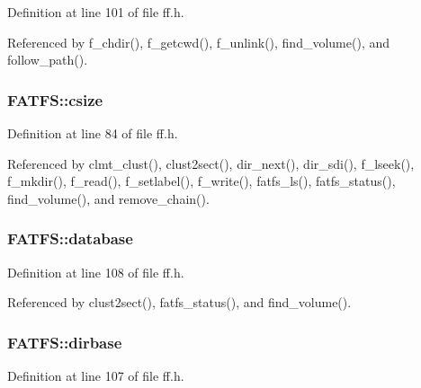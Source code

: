 Definition at line 101 of file ff.\+h.



Referenced by f\+\_\+chdir(), f\+\_\+getcwd(), f\+\_\+unlink(), find\+\_\+volume(), and follow\+\_\+path().

\subsubsection[{\texorpdfstring{csize}{csize}}]{ F\+A\+T\+F\+S\+::csize}\hypertarget{structFATFS_a504a1175f6dcc9a854b9da94463bd108}{}\label{structFATFS_a504a1175f6dcc9a854b9da94463bd108}


Definition at line 84 of file ff.\+h.



Referenced by clmt\+\_\+clust(), clust2sect(), dir\+\_\+next(), dir\+\_\+sdi(), f\+\_\+lseek(), f\+\_\+mkdir(), f\+\_\+read(), f\+\_\+setlabel(), f\+\_\+write(), fatfs\+\_\+ls(), fatfs\+\_\+status(), find\+\_\+volume(), and remove\+\_\+chain().

\subsubsection[{\texorpdfstring{database}{database}}]{ F\+A\+T\+F\+S\+::database}\hypertarget{structFATFS_a5b6c0bc2e9fd2ae8ef714210a74a2d5d}{}\label{structFATFS_a5b6c0bc2e9fd2ae8ef714210a74a2d5d}


Definition at line 108 of file ff.\+h.



Referenced by clust2sect(), fatfs\+\_\+status(), and find\+\_\+volume().

\subsubsection[{\texorpdfstring{dirbase}{dirbase}}]{ F\+A\+T\+F\+S\+::dirbase}\hypertarget{structFATFS_a3f72fd998dbcce4652a85a81fe944bc4}{}\label{structFATFS_a3f72fd998dbcce4652a85a81fe944bc4}


Definition at line 107 of file ff.\+h.



